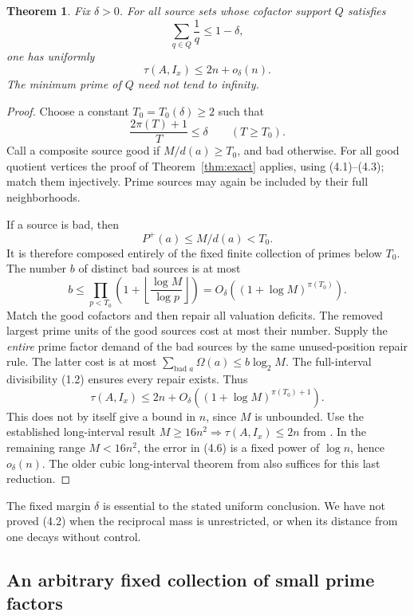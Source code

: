 \documentclass[11pt,a4paper]{article}
\newtheorem{theorem}{Theorem}[section]
\theoremstyle{remark}
\begin{document}
\begin{theorem}
\label{thm:asymclass}
Fix \(\delta>0\). For all source sets whose cofactor support \(Q\)
satisfies
\[
 \sum_{q\in Q}\frac1q\le1-\delta,
 \tag{4.1}
\]
one has uniformly
\[
 \tau(A,I_x)\le2n+o_\delta(n).
 \tag{4.2}
\]
The minimum prime of \(Q\) need not tend to infinity.
\end{theorem}
\begin{proof}
Choose a constant \(T_0=T_0(\delta)\ge2\) such that
\[
 \frac{2\pi(T)+1}{T}\le\delta\qquad(T\ge T_0).
 \tag{4.3}
\]
Call a composite source good if \(M/d(a)\ge T_0\), and bad otherwise.
For all good quotient vertices the proof of Theorem~\ref{thm:exact}
applies, using (4.1)--(4.3); match them injectively. Prime sources may
again be included by their full neighborhoods.

If a source is bad, then
\[
 P^+(a)\le M/d(a)<T_0.
 \tag{4.4}
\]
It is therefore composed entirely of the fixed finite collection of
primes below \(T_0\). The number \(b\) of distinct bad sources is at most
\[
 b\le\prod_{p<T_0}
       \left(1+\left\lfloor\frac{\log M}{\log p}\right\rfloor\right)
 =O_\delta((1+\log M)^{\pi(T_0)}).
 \tag{4.5}
\]
Match the good cofactors and then repair all valuation deficits.
The removed largest prime units of the good sources cost at most their
number. Supply the \emph{entire} prime factor demand of the bad sources
by the same unused-position repair rule. The latter cost is at most
\(\sum_{\text{bad }a}\Omega(a)\le b\log_2M\).
The full-interval divisibility (1.2) ensures every repair exists.
Thus
\[
 \tau(A,I_x)\le
 2n+O_\delta((1+\log M)^{\pi(T_0)+1}).
 \tag{4.6}
\]
This does not by itself give a bound in \(n\), since \(M\) is unbounded.
Use the established long-interval result
\(M\ge16n^2\Rightarrow\tau(A,I_x)\le2n\) from \cite{Wang}.
In the remaining range \(M<16n^2\), the error in (4.6) is a fixed
power of \(\log n\), hence \(o_\delta(n)\).
The older cubic long-interval theorem from \cite{Chen} also suffices
for this last reduction.
\end{proof}

The fixed margin \(\delta\) is essential to the stated uniform
conclusion. We have not proved (4.2) when the reciprocal mass is
unrestricted, or when its distance from one decays without control.

\subsection{An arbitrary fixed collection of small prime factors}
\end{document}
